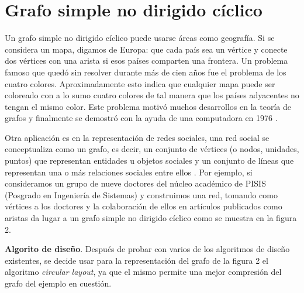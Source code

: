 \documentclass{article}
\begin{document}
\newpage
\section{Grafo simple no dirigido cíclico}
Un grafo simple no dirigido cíclico puede usarse áreas como geografía. Si se considera un mapa, digamos de Europa: que cada país sea un vértice y conecte dos vértices con una arista si esos países comparten una frontera. Un problema famoso que quedó sin resolver durante más de cien años fue el problema de los cuatro colores. Aproximadamente esto indica que cualquier mapa puede ser coloreado con a lo sumo cuatro colores de tal manera que los países adyacentes no tengan el mismo color. Este problema motivó muchos desarrollos en la teoría de grafos y finalmente se demostró con la ayuda de una computadora en 1976 \cite{rf1}.

Otra aplicación es en la representación de redes sociales, una red social se conceptualiza como un grafo, es decir, un conjunto de vértices (o nodos, unidades, puntos) que representan entidades u objetos sociales y un conjunto de líneas que representan una o más relaciones sociales entre ellos \cite {article1}.
Por ejemplo, si consideramos un grupo de nueve doctores del núcleo académico de PISIS (Posgrado en Ingeniería de Sistemas) y construimos una red, tomando como vértices a los doctores y la colaboración de ellos en artículos publicados como aristas da lugar a un grafo simple no dirigido cíclico como se muestra en la figura 2.

\textbf{Algorito de diseño}.
Después de probar con varios de los algoritmos de diseño existentes, se decide usar para la representación del grafo de la figura 2 el algoritmo \textit{circular layout}, ya que el mismo permite una mejor compresión del grafo del ejemplo en cuestión.
\end{document}
